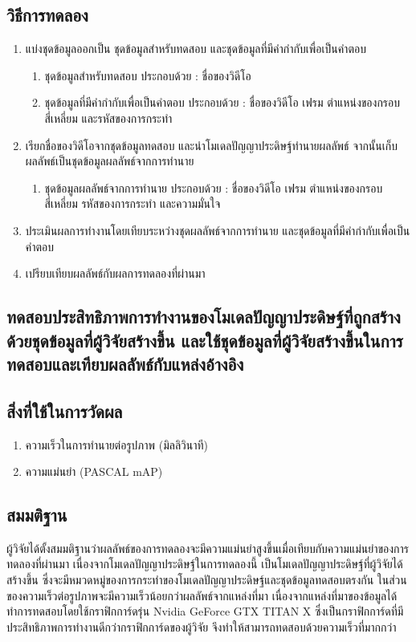 \subsection*{วิธีการทดลอง}
	\begin{enumerate}
		\setlength\itemsep{-0.25em}
		\item แบ่งชุดข้อมูลออกเป็น ชุดข้อมูลสำหรับทดสอบ และชุดข้อมูลที่มีคำกำกับเพื่อเป็นคำตอบ
			\begin{enumerate}
				\setlength\itemsep{-0.25em}
				\item ชุดข้อมูลสำหรับทดสอบ ประกอบด้วย : ชื่อของวิดีโอ
				\item ชุดข้อมูลที่มีคำกำกับเพื่อเป็นคำตอบ ประกอบด้วย : ชื่อของวิดีโอ เฟรม ตำแหน่งของกรอบสี่เหลี่ยม และรหัสของการกระทำ
			\end{enumerate}
		\item เรียกชื่อของวิดีโอจากชุดข้อมูลทดสอบ และนำโมเดลปัญญาประดิษฐ์ทำนายผลลัพธ์ จากนั้นเก็บผลลัพธ์เป็นชุดข้อมูลผลลัพธ์จากการทำนาย
			\begin{enumerate}
				\setlength\itemsep{-0.25em}
				\item ชุดข้อมูลผลลัพธ์จากการทำนาย ประกอบด้วย : ชื่อของวิดีโอ เฟรม ตำแหน่งของกรอบสี่เหลี่ยม รหัสของการกระทำ และความมั่นใจ
			\end{enumerate}
		\item ประเมินผลการทำงานโดยเทียบระหว่างชุดผลลัพธ์จากการทำนาย และชุดข้อมูลที่มีคำกำกับเพื่อเป็นคำตอบ	
		\item เปรียบเทียบผลลัพธ์กับผลการทดลองที่ผ่านมา
\end{enumerate}
\clearpage
\subsection{ทดสอบประสิทธิภาพการทำงานของโมเดลปัญญาประดิษฐ์ที่ถูกสร้างด้วยชุดข้อมูลที่ผู้วิจัยสร้างขึ้น และใช้ชุดข้อมูลที่ผู้วิจัยสร้างขึ้นในการทดสอบและเทียบผลลัพธ์กับแหล่งอ้างอิง}
\subsection*{สิ่งที่ใช้ในการวัดผล}
	\begin{enumerate}
		\setlength\itemsep{-0.25em}
		\item ความเร็วในการทำนายต่อรูปภาพ (มิลลิวินาที)
		\item ความแม่นยำ (PASCAL mAP)
	\end{enumerate}
\subsection*{สมมติฐาน}ผู้วิจัยได้ตั้งสมมติฐานว่าผลลัพธ์ของการทดลองจะมีความแม่นยำสูงขึ้นเมื่อเทียบกับความแม่นยำของการทดลองที่ผ่านมา เนื่องจากโมเดลปัญญาประดิษฐ์ในการทดลองนี้ 
เป็นโมเดลปัญญาประดิษฐ์ที่ผู้วิจัยได้สร้างขึ้น ซึ่งจะมีหมวดหมู่ของการกระทำของโมเดลปัญญาประดิษฐ์และชุดข้อมูลทดสอบตรงกัน ในส่วนของความเร็วต่อรูปภาพจะมีความเร็วน้อยกว่าผลลัพธ์จากแหล่งที่มา 
เนื่องจากแหล่งที่มาของข้อมูลได้ทำการทดสอบโดยใช้กราฟิกการ์ดรุ่น Nvidia GeForce GTX TITAN X ซึ่งเป็นกราฟิกการ์ดที่มีประสิทธิภาพการทำงานดีกว่ากราฟิกการ์ดของผู้วิจัย จึงทำให้สามารถทดสอบด้วยความเร็วที่มากกว่า

